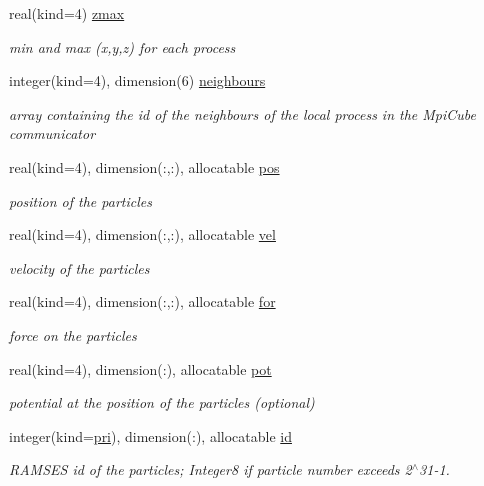 \begin{DoxyCompactItemize}
real(kind=4) \hyperlink{namespacemodvariables_ab9a39f4e4f686b80011f46a2f88617c1}{zmax}
\begin{DoxyCompactList}\small\item\em min and max (x,y,z) for each process \end{DoxyCompactList}\item 
integer(kind=4), dimension(6) \hyperlink{namespacemodvariables_ad84b74b636d64be51d7aba857b4b5c05}{neighbours}
\begin{DoxyCompactList}\small\item\em array containing the id of the neighbours of the local process in the Mpi\+Cube communicator \end{DoxyCompactList}\item 
real(kind=4), dimension(\+:,\+:), allocatable \hyperlink{namespacemodvariables_a2f72d5750b0cf2e9bfa6e139d09c6862}{pos}
\begin{DoxyCompactList}\small\item\em position of the particles \end{DoxyCompactList}\item 
real(kind=4), dimension(\+:,\+:), allocatable \hyperlink{namespacemodvariables_a9f11e44143a4c5cd47740e58712bbe1c}{vel}
\begin{DoxyCompactList}\small\item\em velocity of the particles \end{DoxyCompactList}\item 
real(kind=4), dimension(\+:,\+:), allocatable \hyperlink{namespacemodvariables_a81417dbf044e4c170e3b3ae6eebcd6a1}{for}
\begin{DoxyCompactList}\small\item\em force on the particles \end{DoxyCompactList}\item 
real(kind=4), dimension(\+:), allocatable \hyperlink{namespacemodvariables_a872451e872cc528b38bd43f2ed09b446}{pot}
\begin{DoxyCompactList}\small\item\em potential at the position of the particles (optional) \end{DoxyCompactList}\item 
integer(kind=\hyperlink{namespacemodvariables_a51e0b900e05f4302a36ddf33b6df0649}{pri}), dimension(\+:), allocatable \hyperlink{namespacemodvariables_ac2069a0665c46610db9e57a5d5eaf195}{id}
\begin{DoxyCompactList}\small\item\em R\+A\+M\+S\+ES id of the particles; Integer8 if particle number exceeds 2$^\wedge$31-\/1. \end{DoxyCompactList}\item 

\end{DoxyCompactItemize}
